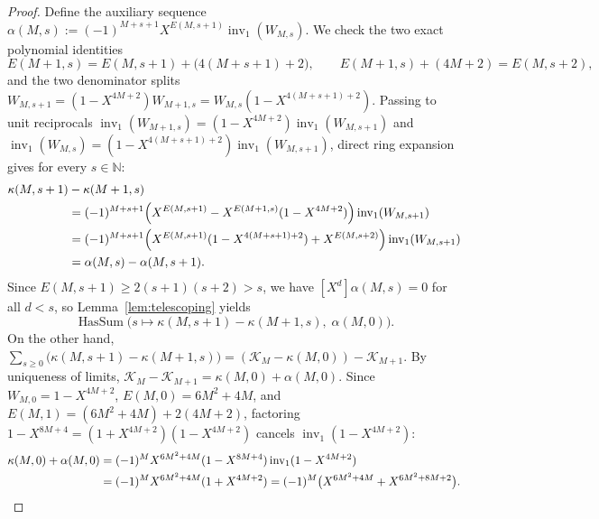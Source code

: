 \documentclass[11pt]{article}
\theoremstyle{definition}
\newcommand{\N}{\mathbb{N}}
\newcommand{\inv}{\operatorname{inv}_1}
\begin{document}
\begin{proof}
Define the auxiliary sequence $\alpha(M, s) := (-1)^{M+s+1} X^{E(M, s+1)} \inv(W_{M, s})$. We check the two exact polynomial identities
\[
E(M + 1, s) = E(M, s + 1) + \bigl(4(M + s + 1) + 2\bigr),
\qquad E(M + 1, s) + (4M + 2) = E(M, s + 2),
\]
and the two denominator splits $W_{M, s+1} = (1 - X^{4M+2}) W_{M+1, s} = W_{M, s} (1 - X^{4(M+s+1)+2})$. Passing to unit reciprocals $\inv(W_{M+1, s}) = (1 - X^{4M+2}) \inv(W_{M, s+1})$ and $\inv(W_{M, s}) = (1 - X^{4(M+s+1)+2}) \inv(W_{M, s+1})$, direct ring expansion gives for every $s \in \N$:
\begin{align*}
\kappa(M, s + 1) &- \kappa(M + 1, s) \\
&= (-1)^{M+s+1} \Bigl(X^{E(M, s+1)} - X^{E(M+1, s)}(1 - X^{4M+2})\Bigr) \inv(W_{M, s+1}) \\
&= (-1)^{M+s+1} \Bigl(X^{E(M, s+1)}(1 - X^{4(M+s+1)+2}) + X^{E(M, s+2)}\Bigr) \inv(W_{M, s+1}) \\
&= \alpha(M, s) - \alpha(M, s + 1).
\end{align*}
Since $E(M, s + 1) \ge 2(s + 1)(s + 2) > s$, we have $[X^d] \alpha(M, s) = 0$ for all $d < s$, so Lemma~\ref{lem:telescoping} yields
\[
\operatorname{HasSum}\bigl(s \mapsto \kappa(M, s + 1) - \kappa(M + 1, s),\; \alpha(M, 0)\bigr).
\]
On the other hand, $\sum_{s \ge 0} \bigl(\kappa(M, s + 1) - \kappa(M + 1, s)\bigr) = (\mathcal{K}_M - \kappa(M, 0)) - \mathcal{K}_{M+1}$. By uniqueness of limits, $\mathcal{K}_M - \mathcal{K}_{M+1} = \kappa(M, 0) + \alpha(M, 0)$. Since $W_{M, 0} = 1 - X^{4M+2}$, $E(M, 0) = 6M^2 + 4M$, and $E(M, 1) = (6M^2 + 4M) + 2(4M + 2)$, factoring $1 - X^{8M+4} = (1 + X^{4M+2})(1 - X^{4M+2})$ cancels $\inv(1 - X^{4M+2})$:
\begin{align*}
\kappa(M, 0) + \alpha(M, 0)
&= (-1)^M X^{6M^2 + 4M} (1 - X^{8M+4}) \inv(1 - X^{4M+2}) \\
&= (-1)^M X^{6M^2 + 4M} (1 + X^{4M+2})
= (-1)^M \bigl(X^{6M^2 + 4M} + X^{6M^2 + 8M + 2}\bigr). \qedhere
\end{align*}
\end{proof}
\end{document}
